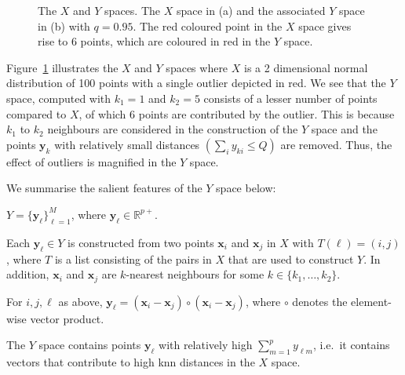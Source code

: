 \documentclass[a4paper,11pt]{article}
\begin{document}
\begin{figure}[!ht]
	\centering
	\hfill
	\caption{The $X$ and $Y$ spaces. The $X$ space in (a) and the associated $Y$ space in (b) with $q = 0.95$. The red coloured point in the $X$ space gives rise to 6 points, which are coloured in red in the $Y$ space.}
	\label{fig:XandY}
\end{figure}

Figure~\ref{fig:XandY} illustrates the $X$ and $Y$ spaces where $X$ is a 2 dimensional normal distribution of 100 points with a single outlier depicted in red. We see that the $Y$ space, computed with $k_1=1$ and $k_2=5$ consists of a lesser number of points compared to $X$, of which 6 points are contributed by the outlier. This is because $k_1$ to $k_2$ neighbours are considered in the construction of the $Y$ space and the points $\bm{y}_k$ with relatively small distances $\left(\sum_i y_{ki} \leq Q\right)$ are removed. Thus, the effect of outliers is magnified in the $Y$ space. %

We summarise the salient features of the $Y$ space below:
\begin{compactenum}
	\item $Y = \{\bm{y}_\ell \}_{\ell=1}^M$, where $\bm{y}_\ell \in \mathbb{R}^{p+}$.
	\item Each $\bm{y}_\ell \in Y$ is constructed from two points $\bm{x}_i$ and $\bm{x}_j$ in $X$ with $T(\ell) = (i,j)$, where $T$ is a list consisting of the pairs in $X$ that are used to construct $Y$. In addition, $\bm{x}_i$ and $\bm{x}_j$ are $k$-nearest neighbours for some $k \in \{k_1, \dots, k_2\}$.
	\item For $i,j,\ell$ as above, $\bm{y}_\ell = (\bm{x}_i - \bm{x}_j) \circ (\bm{x}_i - \bm{x}_j) $, where $\circ$ denotes the element-wise vector product.
	\item The $Y$ space contains points $\bm{y}_\ell$ with relatively high $\sum_{m=1}^p y_{\ell m}$, i.e.\ it contains vectors that contribute to high knn distances in the $X$ space.
\end{compactenum}
\end{document}
